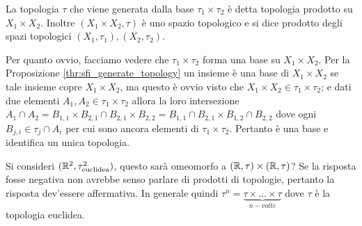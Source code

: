 \begin{definition}
	La topologia $\tau$ che viene generata dalla base $\tau_1 \times \tau_2$ è detta topologia prodotto su $X_1 \times X_2$. Inoltre $(X_1 \times X_2, \tau)$ è uno spazio topologico e si dice prodotto degli spazi topologici $(X_1, \tau_1), (X_2, \tau_2)$.
\end{definition}

\begin{remark}
	Per quanto ovvio, facciamo vedere che $\tau_1 \times \tau_2$ forma una base su $X_1 \times X_2$. Per la Proposizione \ref{thr:sfi_generate_topology} un insieme è una base di $X_1 \times X_2$ se tale insieme copre $X_1 \times X_2$, ma questo è ovvio visto che $X_1 \times X_2 \in \tau_1 \times \tau_2$; e dati due elementi $A_1, A_2 \in \tau_1 \times \tau_2$ allora la loro intersezione $A_1 \cap A_2 = B_{1,1} \times B_{2,1} \cap B_{2,1} \times B_{2,2} = B_{1,1}\cap B_{2,1} \times B_{1,2} \cap B_{2,2}$ dove ogni $B_{j,i} \in \tau_j \cap A_i$ per cui sono ancora elementi di $\tau_1 \times \tau_2$. Pertanto è una base e identifica un unica topologia.
\end{remark}

\begin{example}
	Si consideri $(\mathbb{R}^2, \tau^2_{\text{euclidea}})$, questo sarà omeomorfo a $(\mathbb{R}, \tau) \times (\mathbb{R}, \tau)$? Se la risposta fosse negativa non avrebbe senso parlare di prodotti di topologie, pertanto la risposta dev'essere affermativa. 
	In generale quindi $\tau^n = \underset{n-volte}{\underbrace{\tau \times \dots \times \tau}}$ dove $\tau$ è la topologia euclidea. 
\end{example}

